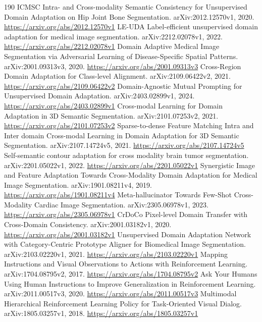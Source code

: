 \documentclass[11pt]{article}
\begin{document}
\begin{thebibliography}{190}
 ICMSC Intra- and Cross-modality Semantic Consistency for Unsupervised Domain Adaptation on Hip Joint Bone Segmentation. arXiv:2012.12570v1, 2020. \url{https://arxiv.org/abs/2012.12570v1}
 LE-UDA Label-efficient unsupervised domain adaptation for medical image segmentation. arXiv:2212.02078v1, 2022. \url{https://arxiv.org/abs/2212.02078v1}
 Domain Adaptive Medical Image Segmentation via Adversarial Learning of Disease-Specific Spatial Patterns. arXiv:2001.09313v3, 2020. \url{https://arxiv.org/abs/2001.09313v3}
 Cross-Region Domain Adaptation for Class-level Alignment. arXiv:2109.06422v2, 2021. \url{https://arxiv.org/abs/2109.06422v2}
 Domain-Agnostic Mutual Prompting for Unsupervised Domain Adaptation. arXiv:2403.02899v1, 2024. \url{https://arxiv.org/abs/2403.02899v1}
 Cross-modal Learning for Domain Adaptation in 3D Semantic Segmentation. arXiv:2101.07253v2, 2021. \url{https://arxiv.org/abs/2101.07253v2}
 Sparse-to-dense Feature Matching Intra and Inter domain Cross-modal Learning in Domain Adaptation for 3D Semantic Segmentation. arXiv:2107.14724v5, 2021. \url{https://arxiv.org/abs/2107.14724v5}
 Self-semantic contour adaptation for cross modality brain tumor segmentation. arXiv:2201.05022v1, 2022. \url{https://arxiv.org/abs/2201.05022v1}
 Synergistic Image and Feature Adaptation Towards Cross-Modality Domain Adaptation for Medical Image Segmentation. arXiv:1901.08211v4, 2019. \url{https://arxiv.org/abs/1901.08211v4}
 Meta-hallucinator Towards Few-Shot Cross-Modality Cardiac Image Segmentation. arXiv:2305.06978v1, 2023. \url{https://arxiv.org/abs/2305.06978v1}
 CrDoCo Pixel-level Domain Transfer with Cross-Domain Consistency. arXiv:2001.03182v1, 2020. \url{https://arxiv.org/abs/2001.03182v1}
 Unsupervised Domain Adaptation Network with Category-Centric Prototype Aligner for Biomedical Image Segmentation. arXiv:2103.02220v1, 2021. \url{https://arxiv.org/abs/2103.02220v1}
 Mapping Instructions and Visual Observations to Actions with Reinforcement Learning. arXiv:1704.08795v2, 2017. \url{https://arxiv.org/abs/1704.08795v2}
 Ask Your Humans Using Human Instructions to Improve Generalization in Reinforcement Learning. arXiv:2011.00517v3, 2020. \url{https://arxiv.org/abs/2011.00517v3}
 Multimodal Hierarchical Reinforcement Learning Policy for Task-Oriented Visual Dialog. arXiv:1805.03257v1, 2018. \url{https://arxiv.org/abs/1805.03257v1}

\end{thebibliography}
\end{document}
